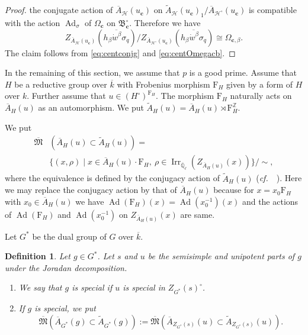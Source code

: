 \documentclass[12pt,a4paper]{article}
\newtheorem{defn}[thm]{Definition}
\DeclareMathOperator{\Irr}{Irr}
\DeclareMathOperator{\Ad}{Ad}
\newcommand{\cf}{\textit{cf.\ }}
\newcommand{\mb}{\mathbb}
\newcommand{\mc}{\mathcal}
\newcommand{\mr}{\mathrm}
\newcommand{\mf}{\mathfrak}
\newcommand{\mbf}{\mathbf}
\newcommand{\ol}{\overline}
\begin{document}
\begin{proof}
the conjugate action of $\ol{A}_{\mc{H}}(u_{\mbf{c}})$ on 
$\widetilde{A}_{\mc{H}}(u_{\mbf{c}})_1 / \ol{A}_{\mc{H}^{\circ}}(u_{\mbf{c}})$ is compatible with the action $\Ad_{\sigma}$ of $\Omega_{\mbf{c}}$ on $\mf{B}_{\mbf{c}}^{\circ}$. 
Therefore we have 
\begin{equation}\label{eq:centOmegacb}
	Z_{\ol{A}_{\mc{H}}(u_{\mbf{c}})}(\ol{h_{\beta} \dot{w}^{\beta} \sigma_q})/ 
	Z_{\ol{A}_{\mc{H}^{\circ}}(u_{\mbf{c}})}(\ol{h_{\beta} \dot{w}^{\beta} \sigma_q}) 
	\cong \Omega_{\mbf{c},\beta}. 
\end{equation}
The claim follows from \eqref{eq:centconjg} and \eqref{eq:centOmegacb}. 
\end{proof}

In the remaining of this section, we assume that $p$ is a good prime. 
Assume that $H$ be a reductive group over $\ol{k}$ with Frobenius morphism $\mr{F}_H$ given by a form of $H$ over $k$. 
Further assume that $u \in (H^{\circ})^{\mr{F}_H}$. The morphism $\mr{F}_H$ naturally acts on $\ol{A}_H(u)$
as an automorphism. We put $\widetilde{A}_{H}(u)=\ol{A}_{H}(u) \rtimes \mr{F}_H^{\mb{Z}}$.

We put
\begin{align*}
	\ol{\mf{M}}&\left( \ol{A}_{H}(u) \subset \widetilde{A}_{H}(u) \right) = \\
	&\{ (x,\rho) \mid x \in \ol{A}_{H}(u) \cdot \mr{F}_H, \ \rho \in \Irr_{\ol{\mb{Q}}_{\ell}} (Z_{\ol{A}_{H}(u)}(x)) \}/{\sim},
\end{align*}
where the equivalence is defined by the conjugacy action of
$\widetilde{A}_{H}(u)$ (\cf~\cite[4.16, 4.21]{LusChred}).
Here we may replace the conjugacy action by that of $\ol{A}_{H}(u)$ because for $x=x_0 \mr{F}_H$ with $x_0 \in \ol{A}_{H}(u)$ we have
$\Ad (\mr{F}_H) (x)=\Ad (x_0^{-1})(x)$ and the actions of $\Ad (\mr{F}_H)$ and $\Ad (x_0^{-1})$ on $Z_{\ol{A}_{H}(u)}(x)$ are same.

Let $G^*$ be the dual group of $G$ over $\ol{k}$.

\begin{defn}
Let $g \in G^*$. Let $s$ and $u$ be the semisimple and unipotent parts of $g$ under the Joradan decomposition.  
\begin{enumerate}
\item 
We say that $g$ is special if $u$ is special in $Z_{G^*}(s)^{\circ}$. 
\item 
If $g$ is special, we put 
\begin{equation*}
 \ol{\mf{M}} \left( \ol{A}_{G^*}(g) \subset \widetilde{A}_{G^*}(g) \right) := 
  \ol{\mf{M}} \left( \ol{A}_{Z_{G^*}(s)}(u) \subset \widetilde{A}_{Z_{G^*}(s)}(u) \right). 
\end{equation*}
\end{enumerate}
\end{defn}
\end{document}

